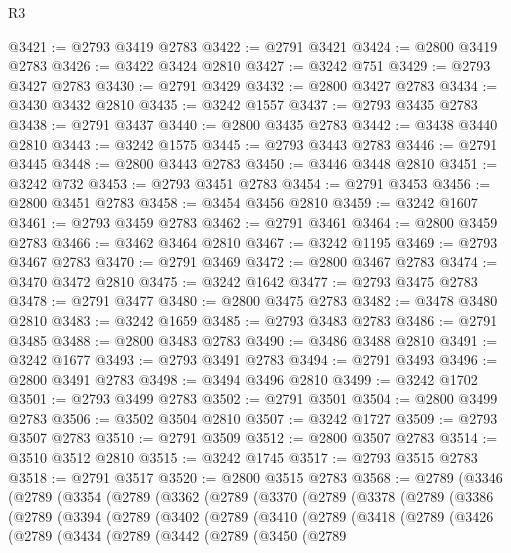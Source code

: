 \begin{lexlean}{R3}
\begin{coremodule}
@3421 := @2793 @3419 @2783
@3422 := @2791 @3421
@3424 := @2800 @3419 @2783
@3426 := @3422 @3424 @2810
@3427 := @3242 @751
@3429 := @2793 @3427 @2783
@3430 := @2791 @3429
@3432 := @2800 @3427 @2783
@3434 := @3430 @3432 @2810
@3435 := @3242 @1557
@3437 := @2793 @3435 @2783
@3438 := @2791 @3437
@3440 := @2800 @3435 @2783
@3442 := @3438 @3440 @2810
@3443 := @3242 @1575
@3445 := @2793 @3443 @2783
@3446 := @2791 @3445
@3448 := @2800 @3443 @2783
@3450 := @3446 @3448 @2810
@3451 := @3242 @732
@3453 := @2793 @3451 @2783
@3454 := @2791 @3453
@3456 := @2800 @3451 @2783
@3458 := @3454 @3456 @2810
@3459 := @3242 @1607
@3461 := @2793 @3459 @2783
@3462 := @2791 @3461
@3464 := @2800 @3459 @2783
@3466 := @3462 @3464 @2810
@3467 := @3242 @1195
@3469 := @2793 @3467 @2783
@3470 := @2791 @3469
@3472 := @2800 @3467 @2783
@3474 := @3470 @3472 @2810
@3475 := @3242 @1642
@3477 := @2793 @3475 @2783
@3478 := @2791 @3477
@3480 := @2800 @3475 @2783
@3482 := @3478 @3480 @2810
@3483 := @3242 @1659
@3485 := @2793 @3483 @2783
@3486 := @2791 @3485
@3488 := @2800 @3483 @2783
@3490 := @3486 @3488 @2810
@3491 := @3242 @1677
@3493 := @2793 @3491 @2783
@3494 := @2791 @3493
@3496 := @2800 @3491 @2783
@3498 := @3494 @3496 @2810
@3499 := @3242 @1702
@3501 := @2793 @3499 @2783
@3502 := @2791 @3501
@3504 := @2800 @3499 @2783
@3506 := @3502 @3504 @2810
@3507 := @3242 @1727
@3509 := @2793 @3507 @2783
@3510 := @2791 @3509
@3512 := @2800 @3507 @2783
@3514 := @3510 @3512 @2810
@3515 := @3242 @1745
@3517 := @2793 @3515 @2783
@3518 := @2791 @3517
@3520 := @2800 @3515 @2783
@3568 := @2789
    (@3346
      (@2789
        (@3354
          (@2789
            (@3362
              (@2789
                (@3370
                  (@2789
                    (@3378
                      (@2789
                        (@3386
                          (@2789
                            (@3394
                              (@2789
                                (@3402
                                  (@2789
                                    (@3410
                                      (@2789
                                        (@3418
                                          (@2789
                                            (@3426
                                              (@2789
                                                (@3434
                                                  (@2789
                                                    (@3442
                                                      (@2789
                                                        (@3450
                                                          (@2789

\end{coremodule}
\end{lexlean}
